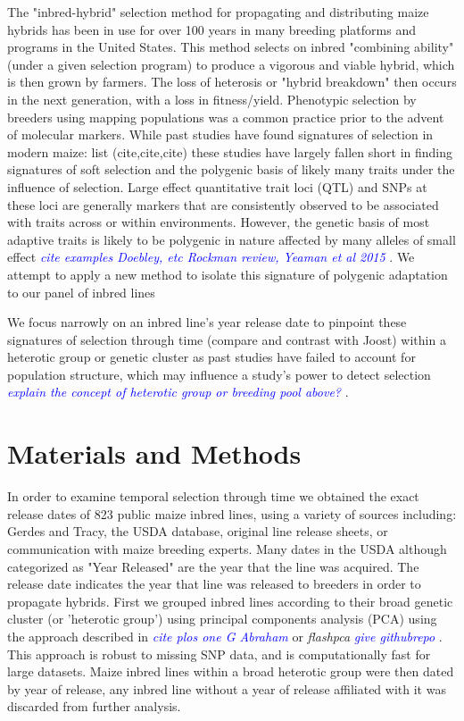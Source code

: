 \documentclass[9pt,twocolumn,twoside]{gsajnl}
\newcommand{\kc}[1]{\textcolor{blue}{ \emph{ #1}} }
\begin{document}
The "inbred-hybrid" selection method for propagating and distributing maize hybrids has been in use for over 100 years in many breeding platforms and programs in the United States. 
This method selects on inbred "combining ability" (under a given selection program) to produce a vigorous and viable hybrid, which is then grown by farmers. 
The loss of heterosis or "hybrid breakdown" then occurs in the next generation, with a loss in fitness/yield.
Phenotypic selection by breeders using mapping populations was a common practice prior to the advent of molecular markers. 
While past studies have found signatures of selection in modern maize: list (cite,cite,cite) these studies have largely fallen short in finding signatures of soft selection and the polygenic basis of likely many traits under the influence of selection. 
Large effect quantitative trait loci (QTL) and SNPs at these loci are generally markers that are consistently observed to be associated with traits across or within environments. 
However, the genetic basis of most adaptive traits is likely to be polygenic in nature affected by many alleles of small effect \kc{cite examples Doebley, etc Rockman review, Yeaman et al 2015}. We attempt to apply a new method to isolate this signature of polygenic adaptation to our panel of inbred lines

We focus narrowly on an inbred line's year release date to pinpoint these signatures of selection through time (compare and contrast with Joost) within a heterotic group or genetic cluster as past studies have failed to account for population structure, which may influence a study's power to detect selection \kc{explain the concept of heterotic group or breeding pool above?}. 



\section*{Materials and Methods}

In order to examine temporal selection through time we obtained the exact release dates of 823 public maize inbred lines, using a variety of sources including: Gerdes and Tracy, the USDA database, original line release sheets, or communication with maize breeding experts. Many dates in the USDA although categorized as "Year Released" are the year that the line was acquired. 
The release date indicates the year that line was released to breeders in order to propagate hybrids.
First we grouped inbred lines according to their broad genetic cluster (or 'heterotic group') using principal components analysis (PCA) using the approach described in  \kc{cite plos one G Abraham} or \textit{flashpca} \kc{give githubrepo}. 
This approach is robust to missing SNP data, and is computationally fast for large datasets.  
Maize inbred lines within a broad heterotic group were then dated by year of release, any inbred line without a year of release affiliated with it was discarded from further analysis.
\end{document}
